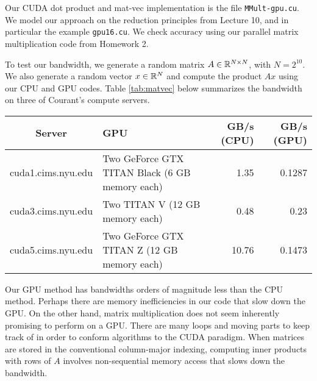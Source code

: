 \begin{questions}


\begin{solution}
    Our CUDA dot product and mat-vec implementation is the file \texttt{MMult-gpu.cu}.
    We model our approach on the reduction principles from Lecture 10,
    and in particular the example \texttt{gpu16.cu}. We check accuracy using our
    parallel matrix multiplication code from Homework 2.
    
    To test our bandwidth, we generate a random matrix $A \in \mathbb{R}^{N \times N}$,
    with $N = 2^{10}$. We also generate a random vector $x \in \mathbb{R}^N$
    and compute the product $Ax$ using our CPU and GPU codes. Table \ref{tab:matvec}
    below summarizes the bandwidth on three of Courant's compute servers.
    
    \begin{center}
    \begin{tabular}{|c|p{5cm}|r|r|}
    \hline
    Server & GPU & GB/s (CPU) & GB/s (GPU) \\
    \hline\hline
    cuda1.cims.nyu.edu & Two GeForce GTX TITAN Black (6 GB memory each) 
        & 1.35 & 0.1287 \\ 
    \hline
    \hline
    cuda3.cims.nyu.edu & Two TITAN V (12 GB memory each) 
        & 0.48 & 0.23 \\ 
    \hline
    cuda5.cims.nyu.edu & Two GeForce GTX TITAN Z (12 GB memory each) 
        & 10.76 & 0.1473 \\ 
    \hline
    \end{tabular}
    \label{tab:matvec}
    \end{center}
    
    Our GPU method has bandwidths orders of magnitude less than the 
    CPU method. 
    Perhaps there are memory inefficiencies in our code that slow down the GPU.
    On the other hand, matrix multiplication does not seem inherently promising
    to perform on a GPU. There are many loops and moving parts to keep track of
    in order to conform algorithms to the CUDA paradigm.
    When matrices are stored in the conventional column-major indexing, 
    computing inner products with rows of $A$ involves non-sequential
    memory access that slows down the bandwidth.
\end{solution}







\end{questions}
